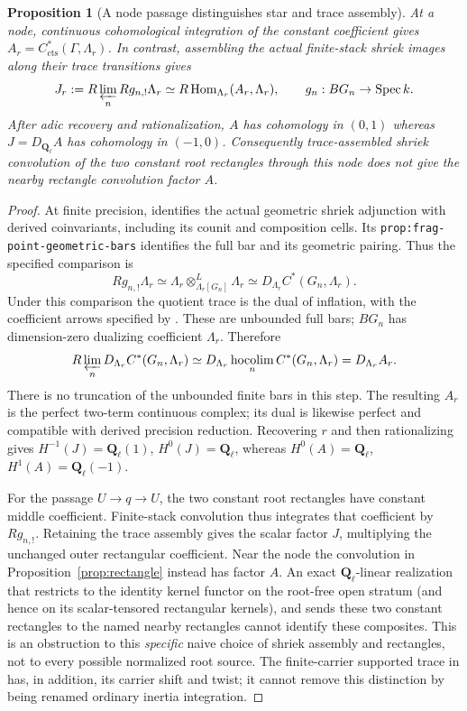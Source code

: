\documentclass[11pt]{article}
\newtheorem{proposition}{Proposition}[section]
\theoremstyle{definition}
\theoremstyle{remark}
\newcommand{\Q}{\mathbf Q_\ell}
\begin{document}
\begin{proposition}[A node passage distinguishes star and trace assembly]
\label{prop:root-node-integral-test}
At a node, continuous cohomological integration of the constant
coefficient gives $A_r=C^*_{\mathrm{cts}}(\Gamma,\Lambda_r)$.
In contrast, assembling the actual finite-stack shriek images
along their trace transitions gives
\[
 J_r:=R\varprojlim_n Rg_{n,!}\Lambda_r
       \simeq R\operatorname{Hom}_{\Lambda_r}(A_r,\Lambda_r),
 \qquad g_n:BG_n\to\operatorname{Spec}k.
\]
After adic recovery and rationalization, $A$ has cohomology in
$(0,1)$ whereas $J=D_{\Q}A$ has cohomology in $(-1,0)$.
Consequently trace-assembled shriek convolution of the two constant
root rectangles through this node does not give the nearby
rectangle convolution factor $A$.
\end{proposition}
\begin{proof}
At finite precision, \cite[\texttt{prop:frag-finite-quotient-enhancement}]{Local}
identifies the actual geometric shriek adjunction with derived
coinvariants, including its counit and composition cells.
Its \texttt{prop:frag-point-geometric-bars} identifies the full bar
and its geometric pairing.  Thus the specified comparison is
\[
 Rg_{n,!}\Lambda_r
 \simeq\Lambda_r\otimes^L_{\Lambda_r[G_n]}\Lambda_r
 \simeq D_{\Lambda_r}C^*(G_n,\Lambda_r).
\]
Under this comparison the quotient trace is the dual of inflation,
with the coefficient arrows specified by
\cite[\texttt{lem:frag-point-trace-diagram-descent}]{Local}.
These are unbounded full bars; $BG_n$ has dimension-zero dualizing
coefficient $\Lambda_r$.  Therefore
\[
 R\varprojlim_n D_{\Lambda_r}C^*(G_n,\Lambda_r)
   \simeq D_{\Lambda_r}\operatorname*{hocolim}_n C^*(G_n,\Lambda_r)
   =D_{\Lambda_r}A_r.
\]
There is no truncation of the unbounded finite bars in this step.
The resulting $A_r$ is the perfect two-term continuous complex;
its dual is likewise perfect and compatible with derived precision
reduction.  Recovering $r$ and then rationalizing gives
$H^{-1}(J)=\Q(1)$, $H^0(J)=\Q$, whereas
$H^0(A)=\Q$, $H^1(A)=\Q(-1)$.

For the passage $U\to q\to U$, the two constant root rectangles
have constant middle coefficient.  Finite-stack convolution thus
integrates that coefficient by $Rg_{n,!}$.  Retaining the trace
assembly gives the scalar factor $J$, multiplying the unchanged
outer rectangular coefficient.  Near the node the convolution in
Proposition~\ref{prop:rectangle} instead has factor $A$.
An exact $\Q$-linear realization that restricts to the identity
kernel functor on the root-free open stratum (and hence on its
scalar-tensored rectangular kernels), and sends these two constant
rectangles to the named
nearby rectangles cannot identify these composites.  This is an
obstruction to this \emph{specific} naive choice of shriek assembly
and rectangles, not to every possible normalized root source.
The finite-carrier supported trace in \cite{Local} has, in addition,
its carrier shift and twist; it cannot remove this distinction by
being renamed ordinary inertia integration.
\end{proof}
\end{document}
